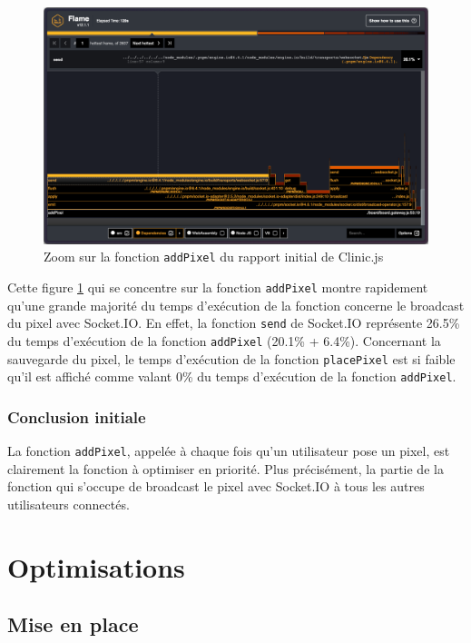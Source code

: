 \begin{figure}[H]
  \centering
  \includegraphics[width=1\textwidth]{./assets/figures/flame/flame1-addPixel.png}
  \caption{Zoom sur la fonction \texttt{addPixel} du rapport initial de Clinic.js}
  \label{fig:flame1-addPixel}
\end{figure}

Cette figure \ref{fig:flame1-addPixel} qui se concentre sur la fonction \texttt{addPixel} montre rapidement qu'une grande majorité du temps d'exécution de la fonction concerne le broadcast du pixel avec Socket.IO. En effet, la fonction \texttt{send} de Socket.IO représente 26.5\% du temps d'exécution de la fonction \texttt{addPixel} (20.1\% + 6.4\%). Concernant la sauvegarde du pixel, le temps d'exécution de la fonction \texttt{placePixel} est si faible qu'il est affiché comme valant 0\% du temps d'exécution de la fonction \texttt{addPixel}.

\subsubsection{Conclusion initiale}

La fonction \texttt{addPixel}, appelée à chaque fois qu'un utilisateur pose un pixel, est clairement la fonction à optimiser en priorité. Plus précisément, la partie de la fonction qui s'occupe de broadcast le pixel avec Socket.IO à tous les autres utilisateurs connectés.

\section{Optimisations}
\label{sec:optimisations}

\subsection{Mise en place}

